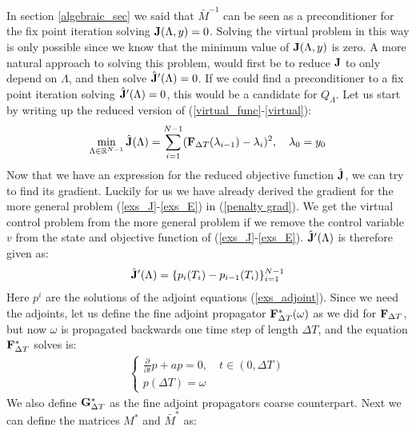 In section \ref{algebraic_sec} we said that $\bar M^{-1}$ can be seen as a preconditioner for the fix point iteration solving $\bold{J}(\Lambda,y)=0$. Solving the virtual problem in this way is only possible since we know that the minimum value of $\bold{J}(\Lambda,y)$ is zero. A more natural approach to solving this problem, would first be to reduce $\bold J$ to only depend on $\Lambda$, and then solve $\hat {\bold J}'(\Lambda)=0$. If we could find a preconditioner to a fix point iteration solving $\hat{ \bold J} '(\Lambda)=0$, this would be a candidate for $Q_{\Lambda}$. Let us start by writing up the reduced version of (\ref{virtual_func}-\ref{virtual}):
\begin{align}
\min_{\Lambda\in\mathbb{R}^{N-1}}\hat {\bold J}(\Lambda) = \sum_{i=1}^{N-1} (\bold F_{\Delta T}(\lambda_{i-1})-\lambda_{i})^2,\quad \lambda_0=y_0 \label{reduced_viritual}
\end{align} 
Now that we have an expression for the reduced objective function $\hat {\bold J}$, we can try to find its gradient. Luckily for us we have already derived the gradient for the more general problem (\ref{exs_J}-\ref{exs_E}) in (\ref{penalty grad}). We get the virtual control problem from the more general problem if we remove the control variable $v$ from the state and objective function of (\ref{exs_J}-\ref{exs_E}). $\hat {\bold J}'(\Lambda)$ is therefore given as:
\begin{align*}
\hat{\bold J}'(\Lambda) = \{p_i(T_i)-p_{i-1}(T_i)\}_{i=1}^{N-1}
\end{align*}
Here $p^i$ are the solutions of the adjoint equations (\ref{exs_adjoint}). Since we need the adjoints, let us define the fine adjoint propagator $\bold{F}_{\Delta T}^*(\omega)$ as we did for $\bold{F}_{\Delta T}$, but now $\omega$ is propagated backwards one time step of length $\Delta T$, and the equation $\bold{F}_{\Delta T}^*$ solves is:   
\begin{align}
\left\{
     \begin{array}{lr}
	\frac{\partial }{\partial t}p +ap=0,\quad t\in (0,\Delta T)  \\
	p(\Delta T) = \omega
	\end{array}
   \right. \label{virtual_adjoint_exs}
\end{align}
We also define $\bold G_{\Delta T}^*$ as the fine adjoint propagators coarse counterpart. Next we can define the matrices $M^*$ and $\bar M^*$ as:
